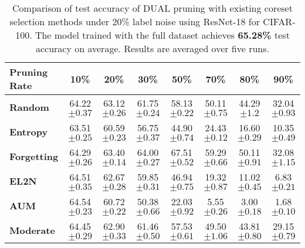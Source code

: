 \begin{table}[ht]
\caption{\label{tab:label_noise_20_cifar}Comparison of test accuracy of DUAL pruning with existing coreset selection methods under 20\% label noise using ResNet-18 for CIFAR-100. The model trained with the full dataset achieves \textbf{65.28\%} test accuracy on average. Results are averaged over five runs.}
\setlength{\tabcolsep}{3pt}
\centering
\begin{tabular}{lccccccc}
    \toprule
    \textbf{Pruning Rate} & \textbf{10\%} & \textbf{20\%} & \textbf{30\%} & \textbf{50\%} & \textbf{70\%} & \textbf{80\%} & \textbf{90\%} \\
    \midrule
    \textbf{Random} & 64.22 \scriptsize{$\pm 0.37 $} & 63.12 \scriptsize{$\pm 0.26 $} & 61.75 \scriptsize{$\pm 0.24 $} & 58.13 \scriptsize{$\pm 0.22 $} & 50.11 \scriptsize{$\pm 0.75 $} & 44.29 \scriptsize{$\pm 1.2 $} & 32.04 \scriptsize{$\pm 0.93 $} \\
    
    \textbf{Entropy} & 63.51 \scriptsize{$\pm 0.25 $} & 60.59 \scriptsize{$\pm 0.23 $} & 56.75 \scriptsize{$\pm 0.37 $} & 44.90 \scriptsize{$\pm 0.74 $} & 24.43 \scriptsize{$\pm 0.12 $} & 16.60 \scriptsize{$\pm 0.29$} & 10.35 \scriptsize{$\pm 0.49$}\\
    
    \textbf{Forgetting} & 64.29 \scriptsize{$\pm 0.26 $} & 63.40 \scriptsize{$\pm 0.14 $} & 64.00 \scriptsize{$\pm 0.27 $} & 67.51 \scriptsize{$\pm 0.52 $} & 59.29 \scriptsize{$\pm 0.66 $} & 50.11 \scriptsize{$\pm 0.91 $} & 32.08 \scriptsize{$\pm 1.15 $} \\
    
    \textbf{EL2N} & 64.51 \scriptsize{$\pm 0.35 $} & 62.67 \scriptsize{$\pm 0.28 $} & 59.85 \scriptsize{$\pm 0.31 $} & 46.94 \scriptsize{$\pm 0.75 $} & 19.32 \scriptsize{$\pm 0.87 $} & 11.02 \scriptsize{$\pm 0.45 $} & 6.83 \scriptsize{$\pm 0.21 $} \\
    
    \textbf{AUM} & 64.54 \scriptsize{$\pm 0.23$} & 60.72 \scriptsize{$\pm 0.22$} & 50.38 \scriptsize{$\pm 0.66$} & 22.03 \scriptsize{$\pm 0.92$}& 5.55 \scriptsize{$\pm 0.26 $} & 3.00 \scriptsize{$\pm 0.18 $} & 1.68 \scriptsize{$\pm 0.10$}\\
    
    \textbf{Moderate} & 64.45 \scriptsize{$\pm 0.29 $} & 62.90 \scriptsize{$\pm 0.33 $} & 61.46 \scriptsize{$\pm 0.50 $} & 57.53 \scriptsize{$\pm 0.61 $} & 49.50 \scriptsize{$\pm 1.06 $} & 43.81 \scriptsize{$\pm 0.80 $} & 29.15 \scriptsize{$\pm 0.79 $}  \\
    

\end{tabular}
\end{table}
